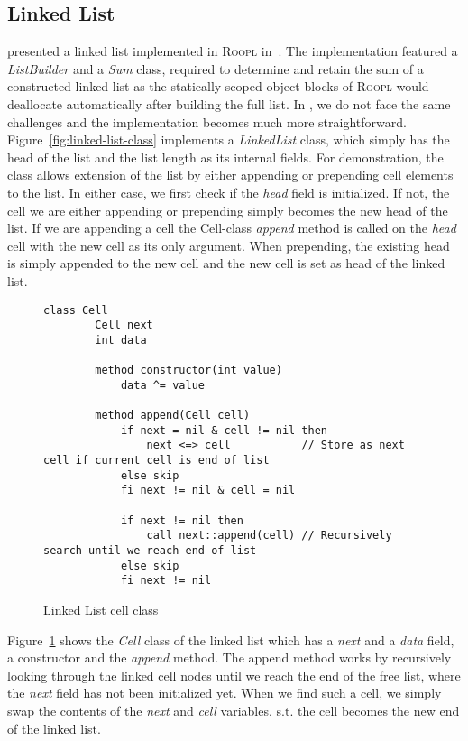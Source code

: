 \subsection{Linked List}
\label{subsec:linked-list}
\citeauthor{th:roopl} presented a linked list implemented in \textsc{Roopl} in~\cite{th:roopl}. The implementation featured a \textit{ListBuilder} and a \textit{Sum} class, required to determine and retain the sum of a constructed linked list as the statically scoped object blocks of \textsc{Roopl} would deallocate automatically after building the full list. In \rooplpp, we do not face the same challenges and the implementation becomes much more straightforward. Figure~\ref{fig:linked-list-class} implements a \textit{LinkedList} class, which simply has the head of the list and the list length as its internal fields. For demonstration, the class allows extension of the list by either appending or prepending cell elements to the list. In either case, we first check if the \textit{head} field is initialized. If not, the cell we are either appending or prepending simply becomes the new head of the list. If we are appending a cell the Cell-class \textit{append} method is called on the \textit{head} cell with the new cell as its only argument. When prepending, the existing head is simply appended to the new cell and the new cell is set as head of the linked list.

\begin{figure}[ht!]
    \centering
    \begin{lstlisting}[style = basic, language = roopl] 
    class Cell
        Cell next
        int data
    
        method constructor(int value)
            data ^= value     
    
        method append(Cell cell)
            if next = nil & cell != nil then
                next <=> cell           // Store as next cell if current cell is end of list
            else skip
            fi next != nil & cell = nil
    
            if next != nil then
                call next::append(cell) // Recursively search until we reach end of list
            else skip
            fi next != nil
    \end{lstlisting}
    \caption{Linked List cell class}
    \label{fig:linked-list-cell-class}
\end{figure}

Figure~\ref{fig:linked-list-cell-class} shows the \textit{Cell} class of the linked list which has a \textit{next} and a \textit{data} field, a constructor and the \textit{append} method. The append method works by recursively looking through the linked cell nodes until we reach the end of the free list, where the \textit{next} field has not been initialized yet. When we find such a cell, we simply swap the contents of the \textit{next} and \textit{cell} variables, s.t. the cell becomes the new end of the linked list.

